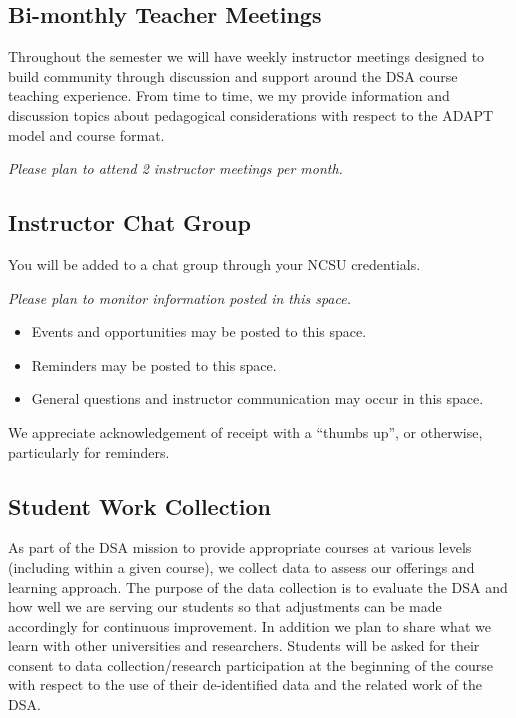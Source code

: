 \documentclass[
]{book}
\providecommand{\tightlist}{%
  \setlength{\itemsep}{0pt}\setlength{\parskip}{0pt}}
\begin{document}
\hypertarget{bi-monthly-teacher-meetings}{%
\subsection{Bi-monthly Teacher Meetings}\label{bi-monthly-teacher-meetings}}

Throughout the semester we will have weekly instructor meetings designed to build community through discussion and support around the DSA course teaching experience. From time to time, we my provide information and discussion topics about pedagogical considerations with respect to the ADAPT model and course format.

{ \emph{Please plan to attend 2 instructor meetings per month.} }

\hypertarget{instructor-chat-group}{%
\subsection{Instructor Chat Group}\label{instructor-chat-group}}

You will be added to a chat group through your NCSU credentials.

{ \emph{Please plan to monitor information posted in this space.} }

\begin{itemize}
\tightlist
\item
  Events and opportunities may be posted to this space.
\item
  Reminders may be posted to this space.
\item
  General questions and instructor communication may occur in this space.
\end{itemize}

We appreciate acknowledgement of receipt with a ``thumbs up'', or otherwise, particularly for reminders.

\hypertarget{student-work-collection}{%
\subsection{Student Work Collection}\label{student-work-collection}}

As part of the DSA mission to provide appropriate courses at various levels (including within a given course), we collect data to assess our offerings and learning approach. The purpose of the data collection is to evaluate the DSA and how well we are serving our students so that adjustments can be made accordingly for continuous improvement. In addition we plan to share what we learn with other universities and researchers. Students will be asked for their consent to data collection/research participation at the beginning of the course with respect to the use of their de-identified data and the related work of the DSA.
\end{document}
